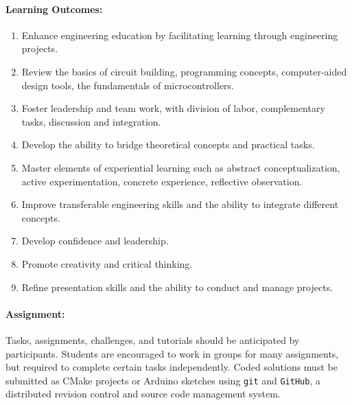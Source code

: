 \documentclass{article}
\begin{document}
%
\paragraph{Learning Outcomes:}
\begin{enumerate}
\item
Enhance engineering education by facilitating learning through engineering projects.

\item
Review the basics of circuit building, programming concepts, computer-aided design tools, the fundamentals of microcontrollers.

\item
Foster leadership and team work, with division of labor, complementary tasks, discussion and integration.

\item
Develop the ability to bridge theoretical concepts and practical tasks.

\item
Master elements of experiential learning such as abstract conceptualization, active experimentation, concrete experience, reflective observation.

\item
Improve transferable engineering skills and the ability to integrate different concepts.

\item
Develop confidence and leadership.

\item
Promote creativity and critical thinking.

\item
Refine presentation skills and the ability to conduct and manage projects.
\end{enumerate}


\paragraph{Assignment:}
Tasks, assignments, challenges, and tutorials should be anticipated by participants.
Students are encouraged to work in groups for many assignments, but required to complete certain tasks independently.
Coded solutions must be submitted as CMake projects or Arduino sketches using \texttt{git} and \texttt{GitHub}, a distributed revision control and source code management system.
\end{document}
